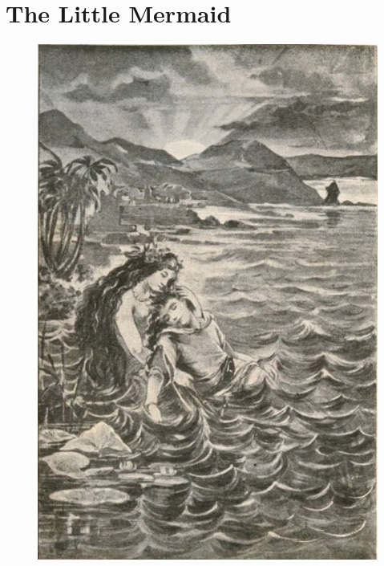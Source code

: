 \chapter{The Little Mermaid}

\begin{figure}
    \centering
    \includegraphics[width=\linewidth]{img/little-mermaid-00.jpeg}
\end{figure}

